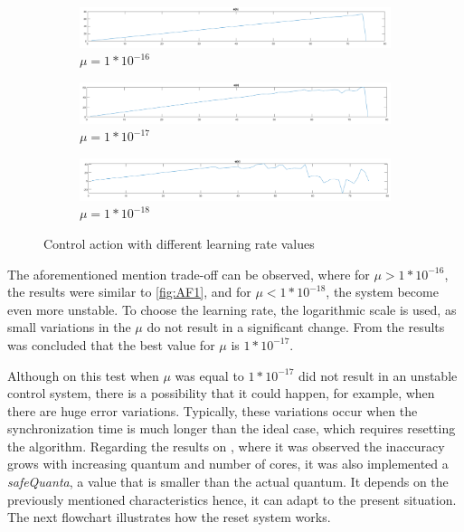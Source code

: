 \begin{figure}
\centering
\begin{subfigure}{\textwidth}
    \includegraphics[width=\textwidth]{Images/AF1.png}
    \caption{ $\mu = 1 * 10^{-16} $ }
    \label{fig:AF1}
\end{subfigure}
\begin{subfigure}{\textwidth}
    \includegraphics[width=\textwidth]{Images/AF2.png}
    \caption{ $\mu = 1 * 10^{-17}$ }
    \label{fig:AF2}
\end{subfigure}
\begin{subfigure}{\textwidth}
    \includegraphics[width=\textwidth]{Images/AF3.png}
    \caption{ $\mu = 1 * 10^{-18}$ }
    \label{fig:AF3}
\end{subfigure}
        
\caption{Control action with different learning rate values}
\label{fig:learningRateTests}
\end{figure}

 The aforementioned mention trade-off can be observed, where for $\mu > 1 * 10^{-16} $, the results were similar to \autoref{fig:AF1}, and 
 for $\mu < 1 * 10^{-18} $, the system become even more unstable. To choose the learning rate, the logarithmic scale is used, as small variations 
 in the $\mu$ do not result in a significant change. From the results was concluded that the best value for $\mu$ is $1 * 10^{-17}$. 

Although on this test when $\mu$ was equal to $1 * 10^{-17}$ did not result in an unstable control system, there is a possibility that it could 
happen, for example, when there are huge error variations. Typically, these variations occur when the synchronization time is much longer than the 
ideal case, which requires resetting the algorithm. Regarding the results on \cite{pargem5}, where it was observed the inaccuracy grows with 
increasing quantum and number of cores, it was also implemented a \textit{safeQuanta}, a value that is smaller than the actual quantum. It depends 
on the previously mentioned characteristics hence, it can adapt to the present situation. The next flowchart illustrates how the reset system works.

